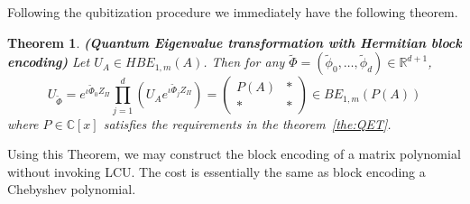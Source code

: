 \documentclass[12pt, oneside]{book}
\newtheorem{theorem}{Theorem}[section]
\theoremstyle{definition}
\theoremstyle{definition}
\theoremstyle{remark}
\begin{document}
Following the qubitization procedure we immediately have the following theorem.

\begin{theorem}
    \textbf{(Quantum Eigenvalue transformation with Hermitian block encoding)} Let $U_A \in HBE_{1,m}(A)$. Then for any $\tilde{\Phi} = (\tilde{\phi}_0,\ldots,\tilde{\phi}_d) \in \mathbb{R}^{d+1}$,
    \[
    U_{\tilde{\Phi}} = e^{\iota \tilde{\Phi}_0 Z_{\Pi}}\prod_{j=1}^d (U_A e^{\iota \tilde{\Phi}_j Z_{\Pi}}) = \begin{pmatrix} P(A) & * \\ * & * \end{pmatrix} \in BE_{1,m} (P(A))
    \]
    where $P \in \mathbb{C}[x]$ satisfies the requirements in the theorem~\ref{the:QET}.
\end{theorem}
Using this Theorem, we may construct the block encoding of a matrix polynomial without invoking LCU. The cost is essentially the same as block encoding a Chebyshev polynomial. 
\end{document}
